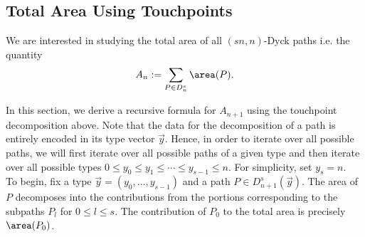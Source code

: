 \documentclass[12pt]{article}
\begin{document}
\begin{figure}[H]
\end{figure}


\subsection{Total Area Using Touchpoints}
\noindent We are interested in studying the total area of all $ (sn,n) $-Dyck paths i.e. the quantity
\[
  A_{n}:= \sum_{P\in D_{n}^{s}}\area(P).
\]

In this section, we derive a recursive formula for $ A_{n+1} $ using the touchpoint decomposition above. 
Note that the data for the decomposition of a path is entirely encoded in its type vector $ \vec{y} $. Hence, in order to iterate over all possible paths, we will first iterate over all possible paths of a given type and then iterate over all possible types $ 0\leq y_{0}\leq y_{1}\leq \cdots \leq y_{s-1} \leq n $. For simplicity, set $ y_{s}=n $.\\

To begin, fix a type $ \vec{y} = (y_{0},\ldots, y_{s-1}) $ and a path $ P\in D_{n+1}^{s}(\vec{y}) $. The area of $ P $ decomposes into the contributions from the portions corresponding to the subpaths $ P_{l} $ for $ 0\leq l \leq s $. The contribution of $ P_{0} $ to the total area is precisely $ \area(P_{0}) $.
\end{document}
